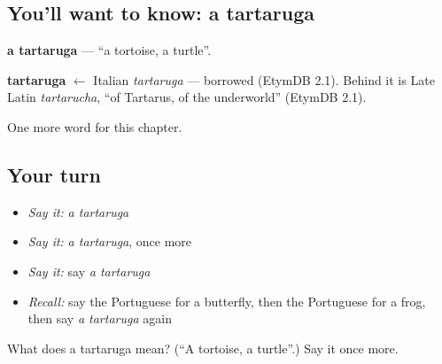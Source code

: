 \subsection*{You'll want to know: a tartaruga}
\textbf{a tartaruga} — \textquotedblleft{}a tortoise, a turtle\textquotedblright{}.

\begin{cousinweb}
\textbf{tartaruga} $\leftarrow$ Italian \emph{tartaruga} — borrowed (EtymDB 2.1). Behind it is Late Latin \emph{tartarucha}, \textquotedblleft{}of Tartarus, of the underworld\textquotedblright{} (EtymDB 2.1).
\end{cousinweb}

\begin{grammarlens}[title={What you've built}]
One more word for this chapter.
\end{grammarlens}

\subsection*{Your turn}
\begin{itemize}
\raggedright
  \item \emph{Say it:} \emph{a tartaruga}
  \item \emph{Say it:} \emph{a tartaruga}, once more
  \item \emph{Say it:} say \emph{a tartaruga}
  \item \emph{Recall:} say the Portuguese for a butterfly, then the Portuguese for a frog, then say \emph{a tartaruga} again
\end{itemize}

\begin{tcolorbox}[breakable,colback=teal!4,colframe=teal!35!black,title={Before you move on}]
What does a tartaruga mean? (\textquotedblleft{}A tortoise, a turtle\textquotedblright{}.) Say it once more.
\end{tcolorbox}
